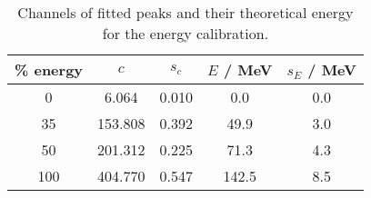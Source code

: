 \begin{table}[H]
\caption{Channels of fitted peaks and their theoretical energy for the energy calibration.}
\begin{center}
\begin{tabular}{|c|c|c|c|c|}
  \hline
  \% energy & $c$ & $s_c$ & $E$ / MeV & $s_E$ / MeV \\ \hline
  0 & 6.064 & 0.010 & 0.0 & 0.0 \\ \hline
  35 & 153.808 & 0.392 & 49.9 & 3.0 \\ \hline
  50 & 201.312 & 0.225 & 71.3 & 4.3 \\ \hline
  100 & 404.770 & 0.547 & 142.5 & 8.5 \\ \hline
\end{tabular}
\end{center}
\label{tab:ecal}
\end{table}
